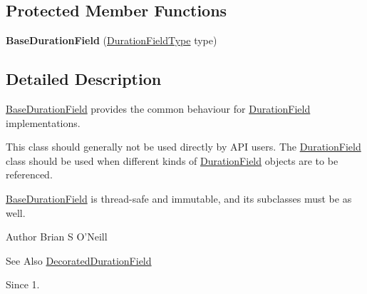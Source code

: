 \subsection*{Protected Member Functions}
\begin{DoxyCompactItemize}
\item 
\hypertarget{classorg_1_1joda_1_1time_1_1field_1_1_base_duration_field_ae17f15dfb44f475dc3a75b4adf608fbd}{{\bfseries Base\-Duration\-Field} (\hyperlink{classorg_1_1joda_1_1time_1_1_duration_field_type}{Duration\-Field\-Type} type)}\label{classorg_1_1joda_1_1time_1_1field_1_1_base_duration_field_ae17f15dfb44f475dc3a75b4adf608fbd}

\end{DoxyCompactItemize}


\subsection{Detailed Description}
\hyperlink{classorg_1_1joda_1_1time_1_1field_1_1_base_duration_field}{Base\-Duration\-Field} provides the common behaviour for \hyperlink{classorg_1_1joda_1_1time_1_1_duration_field}{Duration\-Field} implementations. 

This class should generally not be used directly by A\-P\-I users. The \hyperlink{classorg_1_1joda_1_1time_1_1_duration_field}{Duration\-Field} class should be used when different kinds of \hyperlink{classorg_1_1joda_1_1time_1_1_duration_field}{Duration\-Field} objects are to be referenced. 

\hyperlink{classorg_1_1joda_1_1time_1_1field_1_1_base_duration_field}{Base\-Duration\-Field} is thread-\/safe and immutable, and its subclasses must be as well.

\begin{DoxyAuthor}{Author}
Brian S O'Neill 
\end{DoxyAuthor}
\begin{DoxySeeAlso}{See Also}
\hyperlink{classorg_1_1joda_1_1time_1_1field_1_1_decorated_duration_field}{Decorated\-Duration\-Field} 
\end{DoxySeeAlso}
\begin{DoxySince}{Since}
1. 
\end{DoxySince}


